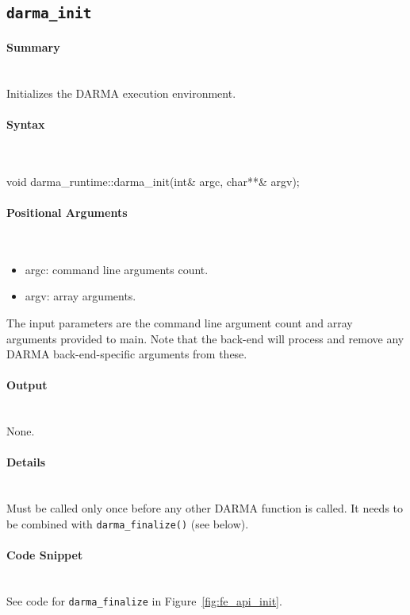 
\subsection{\texttt{darma\_init}}

\paragraph{Summary}\mbox{}\\
Initializes the DARMA execution environment.

\paragraph{Syntax}\mbox{}\\
\begin{CppCode}
void darma_runtime::darma_init(int& argc, char**& argv);
\end{CppCode}

\paragraph{Positional Arguments}\mbox{}\\
\begin{itemize}
\item argc: command line arguments count.
\item argv: array arguments.
\end{itemize}
The input parameters are the command line argument count 
and array arguments provided to main.  
Note that the back-end will process and remove 
any DARMA back-end-specific arguments from these.

\paragraph{Output}\mbox{}\\
None.


\paragraph{Details}\mbox{}\\
Must be called only once before any other DARMA function is called.
It needs to be combined with \texttt{darma\_finalize()} (see below).

\paragraph{Code Snippet}\mbox{}\\ 
See code for \texttt{darma\_finalize} in Figure~\ref{fig:fe_api_init}.


